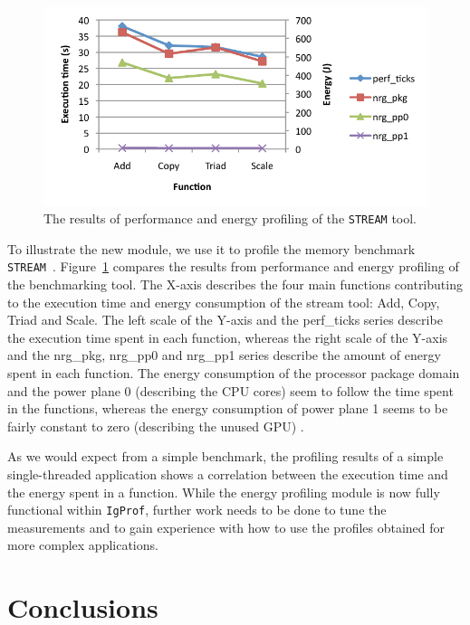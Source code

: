 \documentclass[a4paper]{jpconf}
\begin{document}
\begin{figure}[tbp]
  \begin{center}
    \includegraphics{img/stream-pp-np.pdf}
  \end{center}
  \vspace{-20pt}
  \caption{The results of performance and energy profiling of the \texttt{STREAM} tool.}
  \label{fig:stream-pp-np}
\end{figure}

To illustrate the new module, we use it to profile the memory
benchmark \texttt{STREAM}~\cite{stream-web}. Figure~\ref{fig:stream-pp-np}
compares the results from performance and energy profiling of the
benchmarking tool. The X-axis describes the four main functions
contributing to the execution time and energy consumption of the
stream tool: Add, Copy, Triad and Scale. The left scale of the
Y-axis and the perf\_ticks series describe the execution time spent
in each function, whereas the right scale of the Y-axis and the
nrg\_pkg, nrg\_pp0 and nrg\_pp1 series describe the amount of energy
spent in each function. The energy consumption of the processor
package domain and the power plane 0 (describing the CPU cores)
seem to follow the time spent in the functions, whereas the energy
consumption of power plane 1 seems to be fairly constant to zero
(describing the unused GPU) .

As we would expect from a simple benchmark, the profiling results of
a simple single-threaded application shows a correlation between
the execution time and the energy spent in a function.
While the energy profiling module is now fully functional within 
\texttt{IgProf}, further work needs to be done to tune the measurements 
and to gain experience with how to use the profiles obtained for
more complex applications.

\section{Conclusions}
\end{document}
